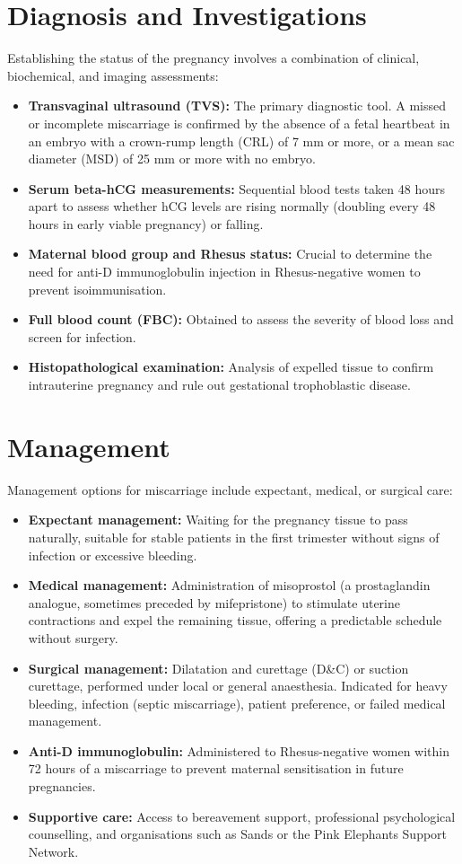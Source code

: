 \section*{Diagnosis and Investigations}
Establishing the status of the pregnancy involves a combination of clinical, biochemical, and imaging assessments:
\begin{itemize}
    \item \textbf{Transvaginal ultrasound (TVS):} The primary diagnostic tool. A missed or incomplete miscarriage is confirmed by the absence of a fetal heartbeat in an embryo with a crown-rump length (CRL) of 7 mm or more, or a mean sac diameter (MSD) of 25 mm or more with no embryo.
    \item \textbf{Serum beta-hCG measurements:} Sequential blood tests taken 48 hours apart to assess whether hCG levels are rising normally (doubling every 48 hours in early viable pregnancy) or falling.
    \item \textbf{Maternal blood group and Rhesus status:} Crucial to determine the need for anti-D immunoglobulin injection in Rhesus-negative women to prevent isoimmunisation.
    \item \textbf{Full blood count (FBC):} Obtained to assess the severity of blood loss and screen for infection.
    \item \textbf{Histopathological examination:} Analysis of expelled tissue to confirm intrauterine pregnancy and rule out gestational trophoblastic disease.
\end{itemize}

\section*{Management}
Management options for miscarriage include expectant, medical, or surgical care:
\begin{itemize}
    \item \textbf{Expectant management:} Waiting for the pregnancy tissue to pass naturally, suitable for stable patients in the first trimester without signs of infection or excessive bleeding.
    \item \textbf{Medical management:} Administration of misoprostol (a prostaglandin analogue, sometimes preceded by mifepristone) to stimulate uterine contractions and expel the remaining tissue, offering a predictable schedule without surgery.
    \item \textbf{Surgical management:} Dilatation and curettage (D\&C) or suction curettage, performed under local or general anaesthesia. Indicated for heavy bleeding, infection (septic miscarriage), patient preference, or failed medical management.
    \item \textbf{Anti-D immunoglobulin:} Administered to Rhesus-negative women within 72 hours of a miscarriage to prevent maternal sensitisation in future pregnancies.
    \item \textbf{Supportive care:} Access to bereavement support, professional psychological counselling, and organisations such as Sands or the Pink Elephants Support Network.
\end{itemize}

